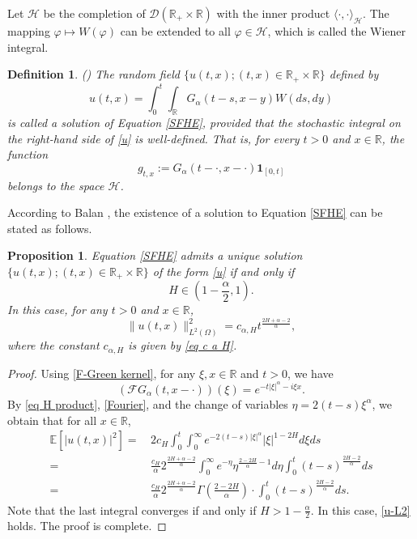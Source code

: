 \documentclass[11pt,reqno]{amsart}
\numberwithin{equation}{section}
\newtheorem{proposition}[theorem]{Proposition}
\newtheorem{definition}[theorem]{Definition}
\def\RR{\mathbb{R}}
\def\EE{\mathbb{E}}
\newcommand{\1}{{\bf 1}}
\newcommand{\2}{{\bf 2}}
\begin{document}
     Let $\mathcal H$  be the completion of $\mathcal D(\RR_+\times\RR)$ with the inner product
     $\langle\cdot,\cdot\rangle_{\mathcal H}$. The mapping $\varphi\mapsto W(\varphi)$ can be extended to all $\varphi\in\mathcal H$, which is called the Wiener integral.
\begin{definition}(\cite[Definition 4.1]{B2012})
The random field  $\{u(t,x); (t,x)\in \mathbb R_+\times \mathbb R\}$ defined by
\begin{equation}\label{u}
u(t, x)= \int_0^t \int_{\mathbb{R}}G_{\alpha}(t-s,x-y)  W(ds,dy)
\end{equation}
is called a  solution of Equation \eqref{SFHE}, provided that the stochastic integral on the right-hand side of \eqref{u} is well-defined. That is,  for every $t>0$ and $x\in\RR$, the function 
$$
g_{t,x}:=G_{\alpha}(t-\cdot,x-\cdot){\mathbf 1}_{[0,t]} 
$$
belongs to the space $\mathcal H$.
\end{definition}
  According to  Balan   \cite[Remark 5.4]{B2012},  the existence of a solution to Equation  \eqref{SFHE} can be stated as follows. 
\begin{proposition}\label{solution}  Equation \eqref{SFHE}  admits  a unique  solution $\{u(t,x); (t,x)\in \mathbb R_+\times \mathbb R\}$ of the form   \eqref{u} if and only if $$H\in\left(1-\frac{\alpha}{2},1\right).$$ In this case, for any $t>0$ and $x\in \mathbb R$, 
\begin{equation}\label{u-L2}
\|u(t,x)\|_{L^2(\Omega)}^2=c_{\alpha, H}t^{\frac{2H+\alpha-2}{\alpha}},
\end{equation}
where the constant  $c_{\alpha, H}$ is given by \eqref{eq c a H}.
\end{proposition}
\begin{proof}
Using \eqref{F-Green kernel},     for any $ \xi,x\in\RR$  and $t>0$, we have 
\begin{equation}\label{Fourier}
(\mathcal {F}G_{\alpha}(t,x-\cdot))(\xi)=e^{-t|\xi|^{\alpha}-i\xi x}.
\end{equation}
By \eqref{eq H product}, \eqref{Fourier}, and the change of variables
$\eta= 2(t-s) \xi^{\alpha}$, we obtain that   for all $x\in\RR$,
\begin{equation}\label{eq u moment}
\begin{split}
\EE\left[|u(t,x)|^2\right]
=&\,2c_{H}\int_0^t\int_0^{\infty}e^{-2(t-s)|\xi|^{\alpha}}|\xi|^{1-2H}d\xi ds \\
=&\, \frac{c_{H}}{\alpha}2^{\frac{2H+\alpha-2}{\alpha}}\int_0^\infty e^{-\eta }\eta^{\frac{2-2H}{\alpha}-1} d\eta \int_0^{t} (t-s)^{\frac{2H-2}{\alpha}} ds \\
=&\, \frac{c_{H}}{\alpha}2^{\frac{2H+\alpha-2}{\alpha}} \Gamma\left(\frac{2-2H}{\alpha}\right)\cdot \int_0^{t} (t-s)^{\frac{2H-2}{\alpha}} ds.
\end{split}
\end{equation}
Note that the last integral  converges if and only if $H> 1-\frac{\alpha}{2}$. In this case,   \eqref{u-L2} holds. The proof is complete.
\end{proof}
\end{document}
